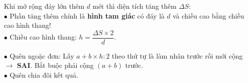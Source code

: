 \documentclass[14pt,a4paper,oneside]{extbook}
\begin{document}
\vspace{3mm}

\noindent
\begin{minipage}[t]{0.54\textwidth}
  \begin{tcolorbox}[
    enhanced,
    title={\footnotesize\bfseries\color{white}\faExpandArrowsAlt\ Dạng toán tăng thêm độ dài đáy},
    colback=green!3!white,
    colframe=green!60!black,
    arc=2.5mm, boxrule=0.8pt, top=1.8mm, bottom=1.8mm, left=2.2mm, right=2.2mm
  ]
    \footnotesize
    Khi mở rộng đáy lớn thêm $d$ mét thì diện tích tăng thêm $\Delta S$:\\
    $\bullet$ Phần tăng thêm chính là \textbf{hình tam giác} có đáy là $d$ và chiều cao bằng chiều cao hình thang!\\
    $\bullet$ Chiều cao hình thang: $h = \dfrac{\Delta S \times 2}{d}$.
  \end{tcolorbox}
\end{minipage}%
\hfill
\begin{minipage}[t]{0.44\textwidth}
  \begin{tcolorbox}[
    enhanced,
    title={\footnotesize\bfseries\color{white}\faExclamationTriangle\ Mẹo tránh bẫy trắc nghiệm},
    colback=red!2!white,
    colframe=red!70!black,
    arc=2.5mm, boxrule=0.8pt, top=1.8mm, bottom=1.8mm, left=2.2mm, right=2.2mm
  ]
    \footnotesize
    $\bullet$ Quên ngoặc đơn: Lấy $a + b \times h : 2$ theo thứ tự là làm nhân trước rồi mới cộng $\rightarrow$ \textbf{SAI}. Bắt buộc phải cộng $(a+b)$ trước.\\
    $\bullet$ Quên chia đôi kết quả.
  \end{tcolorbox}
\end{minipage}
\end{document}
